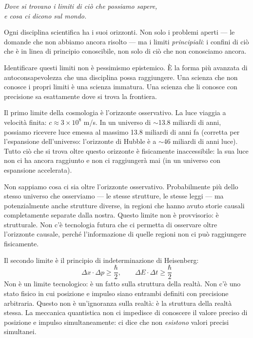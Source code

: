 \documentclass[12pt,a4paper,openany]{book}
\newcommand{\sezione}[1]{\vspace{1.2em}{\large\bfseries #1}\vspace{0.5em}\par}
\begin{document}
\begin{center}
\itshape
Dove si trovano i limiti di ciò che possiamo sapere,\\
e cosa ci dicono sul mondo.
\end{center}

\bigskip

Ogni disciplina scientifica ha i suoi orizzonti. Non solo i problemi aperti --- le domande che non abbiamo ancora risolto --- ma i limiti \textit{principiali}: i confini di ciò che è in linea di principio conoscibile, non solo di ciò che non conosciamo ancora.

Identificare questi limiti non è pessimismo epistemico. È la forma più avanzata di autoconsapevolezza che una disciplina possa raggiungere. Una scienza che non conosce i propri limiti è una scienza immatura. Una scienza che li conosce con precisione sa esattamente dove si trova la frontiera.

\sezione{I limiti della fisica: l'orizzonte osservativo}

Il primo limite della cosmologia è l'orizzonte osservativo. La luce viaggia a velocità finita: $c \approx 3 \times 10^8$ m/s. In un universo di $\sim$13.8 miliardi di anni, possiamo ricevere luce emessa al massimo 13.8 miliardi di anni fa (corretta per l'espansione dell'universo: l'orizzonte di Hubble è a $\sim$46 miliardi di anni luce). Tutto ciò che si trova oltre questo orizzonte è fisicamente inaccessibile: la sua luce non ci ha ancora raggiunto e non ci raggiungerà mai (in un universo con espansione accelerata).

Non sappiamo cosa ci sia oltre l'orizzonte osservativo. Probabilmente più dello stesso universo che osserviamo --- le stesse strutture, le stesse leggi --- ma potenzialmente anche strutture diverse, in regioni che hanno avuto storie causali completamente separate dalla nostra. Questo limite non è provvisorio: è strutturale. Non c'è tecnologia futura che ci permetta di osservare oltre l'orizzonte causale, perché l'informazione di quelle regioni non ci può raggiungere fisicamente.

\sezione{I limiti della meccanica quantistica: l'indeterminazione di Heisenberg}

Il secondo limite è il principio di indeterminazione di Heisenberg:
\[
\Delta x \cdot \Delta p \geq \frac{\hbar}{2}, \qquad \Delta E \cdot \Delta t \geq \frac{\hbar}{2}
\]
Non è un limite tecnologico: è un fatto sulla struttura della realtà. Non c'è uno stato fisico in cui posizione e impulso siano entrambi definiti con precisione arbitraria. Questo non è un'ignoranza sulla realtà: è la struttura della realtà stessa. La meccanica quantistica non ci impedisce di conoscere il valore preciso di posizione e impulso simultaneamente: ci dice che non \textit{esistono} valori precisi simultanei.
\end{document}
